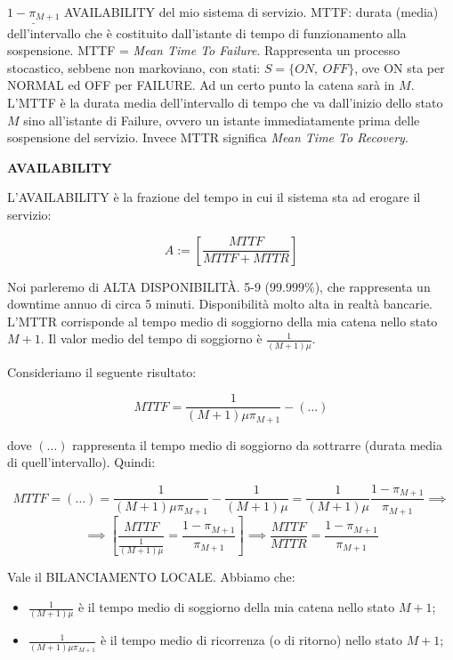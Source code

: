 $\underline{1-\pi_{M+1}}$ AVAILABILITY del mio sistema di servizio. MTTF: durata (media) dell'intervallo che è costituito dall'istante di tempo di funzionamento alla sospensione. MTTF = \textit{Mean Time To Failure}. Rappresenta un processo stocastico, sebbene non markoviano, con stati: $S=\{ON,\ OFF\}$, ove ON sta per NORMAL ed OFF per FAILURE. Ad un certo punto la catena sarà in $M$. L'MTTF è la durata media dell'intervallo di tempo che va dall'inizio dello stato $M$ sino all'istante di Failure, ovvero un istante immediatamente prima delle sospensione del servizio. Invece MTTR significa \textit{Mean Time To Recovery}.

\begin{defn}{\textbf{AVAILABILITY}}

L'AVAILABILITY è la frazione del tempo in cui il sistema sta ad erogare il servizio:

\[	
	A := [\frac{MTTF}{MTTF+MTTR}]
\]

\end{defn}

Noi parleremo di ALTA DISPONIBILIT\`A. 5-9 ($99.999\%$), che rappresenta un downtime annuo di circa 5 minuti. Disponibilità molto alta in realtà bancarie. L'MTTR corrisponde al tempo medio di soggiorno della mia catena nello stato $M+1$. Il valor medio del tempo di soggiorno è $\frac{1}{(M+1)\mu}$. 

Consideriamo il seguente risultato:

\[
	MTTF = \frac{1}{(M+1)\mu\pi_{M+1}} - (\dots)
\]

dove $(\dots)$ rappresenta il tempo medio di soggiorno da sottrarre (durata media di quell'intervallo). Quindi:

\[
	MTTF = (\dots) = \frac{1}{(M+1)\mu\pi_{M+1}} - \frac{1}{(M+1)\mu} = \frac{1}{(M+1)\mu} \frac{1-\pi_{M+1}}{\pi_{M+1}} \implies
\]
\[
	\implies [\frac{MTTF}{\frac{1}{(M+1)\mu}} = \frac{1-\pi_{M+1}}{\pi_{M+1}}] \implies \frac{MTTF}{MTTR} = \frac{1-\pi_{M+1}}{\pi_{M+1}}
\]

Vale il BILANCIAMENTO LOCALE. Abbiamo che:

\begin{itemize}

\item{$\frac{1}{(M+1)\mu}$} è il tempo medio di soggiorno della mia catena nello stato $M+1$;
\item{$\frac{1}{(M+1)\mu\pi_{M+1}}$} è il tempo medio di ricorrenza (o di ritorno) nello stato $M+1$;
\end{itemize}

